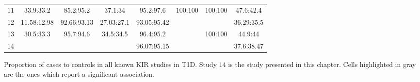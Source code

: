 \begin{table}[h]
\begin{tabularx}{\textwidth}{lccccccc}
11              & 33.9:33.2   & 85.2:95.2   & 37.1:34     & 95.2:97.6   & 100:100     & 100:100    & 47.6:42.4\\
12              & 11.58:12.98 & 92.66:93.13 & 27.03:27.1  & 93.05:95.42 &             &            & 36.29:35.5\\
13              & 30.5:33.3   & 95.7:94.6   & 34.5:34.5   & 96.4:95.2   &             & 100:100    & 44.9:44\\
14              &             &             &             & 96.07:95.15 &             &            & 37.6:38.47\\
\end{tabularx}
{Proportion of cases to controls in all known \gls{KIR} studies in T1D.}
{
  Study $14$ is the study presented in this chapter.
  Cells highlighted in gray are the ones which report a significant association.
}
\end{table}

